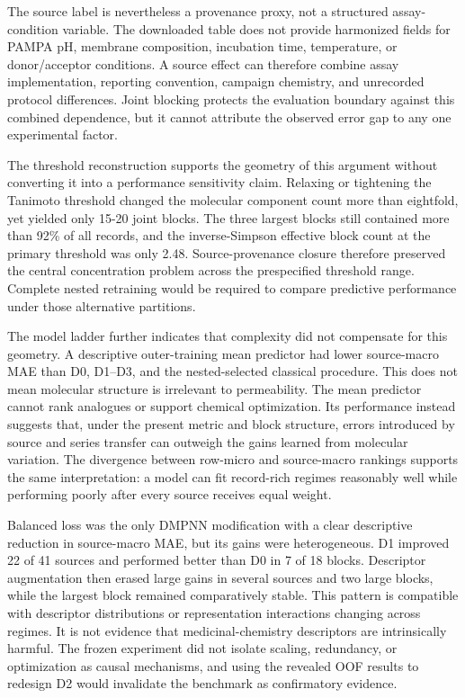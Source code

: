\documentclass[referee,lineno,pdflatex,sn-vancouver-num]{sn-jnl}
\begin{document}
The source label is nevertheless a provenance proxy, not a structured assay-condition variable. The downloaded table does not provide harmonized fields for PAMPA pH, membrane composition, incubation time, temperature, or donor/acceptor conditions. A source effect can therefore combine assay implementation, reporting convention, campaign chemistry, and unrecorded protocol differences. Joint blocking protects the evaluation boundary against this combined dependence, but it cannot attribute the observed error gap to any one experimental factor.

The threshold reconstruction supports the geometry of this argument without converting it into a performance sensitivity claim. Relaxing or tightening the Tanimoto threshold changed the molecular component count more than eightfold, yet yielded only 15-20 joint blocks. The three largest blocks still contained more than 92\% of all records, and the inverse-Simpson effective block count at the primary threshold was only 2.48. Source-provenance closure therefore preserved the central concentration problem across the prespecified threshold range. Complete nested retraining would be required to compare predictive performance under those alternative partitions.

The model ladder further indicates that complexity did not compensate for this geometry. A descriptive outer-training mean predictor had lower source-macro MAE than D0, D1--D3, and the nested-selected classical procedure. This does not mean molecular structure is irrelevant to permeability. The mean predictor cannot rank analogues or support chemical optimization. Its performance instead suggests that, under the present metric and block structure, errors introduced by source and series transfer can outweigh the gains learned from molecular variation. The divergence between row-micro and source-macro rankings supports the same interpretation: a model can fit record-rich regimes reasonably well while performing poorly after every source receives equal weight.

Balanced loss was the only DMPNN modification with a clear descriptive reduction in source-macro MAE, but its gains were heterogeneous. D1 improved 22 of 41 sources and performed better than D0 in 7 of 18 blocks. Descriptor augmentation then erased large gains in several sources and two large blocks, while the largest block remained comparatively stable. This pattern is compatible with descriptor distributions or representation interactions changing across regimes. It is not evidence that medicinal-chemistry descriptors are intrinsically harmful. The frozen experiment did not isolate scaling, redundancy, or optimization as causal mechanisms, and using the revealed OOF results to redesign D2 would invalidate the benchmark as confirmatory evidence.
\end{document}
